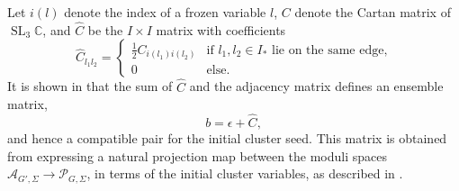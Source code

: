 \documentclass[a4paper]{article}
\numberwithin{equation}{section}
\newcommand{\1}{{\mathrm{1}\mkern-4mu{\mathchoice{}{}{\mskip-0.5mu}{\mskip-1mu}}\mathrm{l}}}
\newcommand{\CC}{\mathbb{C}}
\DeclareMathOperator{\SL}{SL}
\begin{document}
Let $i(l)$ denote the index of a frozen variable $l$, $C$ denote the Cartan matrix of $\SL_3\CC$, and $\hat{C}$ be the $I\times I$ matrix with coefficients
\begin{equation}
\hat{C}_{l_1l_2} = 
    \begin{cases}
    \frac{1}{2} C_{i(l_1)i(l_2)} & \text{if } l_1,l_2 \in I_\ast \text{ lie on the same edge,}\\
    0 &  \text{else.}
\end{cases}
\end{equation}
It is shown in \cite[Lemma 4.16]{SS25} that the sum of $\hat{C}$ and the adjacency matrix defines an ensemble matrix,
\begin{equation}
    b = \epsilon + \hat{C},
\end{equation}
and hence a compatible pair for the initial cluster seed.
This matrix is obtained from expressing a natural projection map between the moduli spaces $\mathcal{A}_{G',\Sigma} \to \mathcal{P}_{G,\Sigma}$, in terms of the initial cluster variables, as described in \cite[Section 13]{Goncharov_Shen_2020}.
\end{document}

